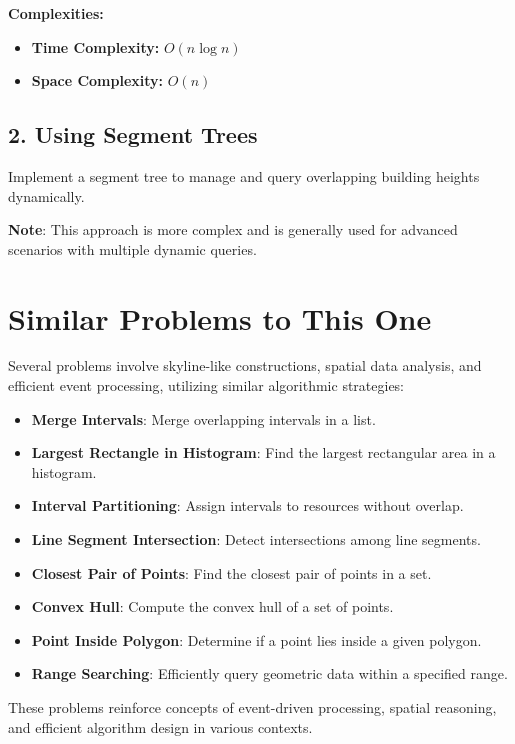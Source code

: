 \textbf{Complexities:}
\begin{itemize}
    \item \textbf{Time Complexity:} \(O(n \log n)\)
    \item \textbf{Space Complexity:} \(O(n)\)
\end{itemize}

\subsection*{2. Using Segment Trees}

Implement a segment tree to manage and query overlapping building heights dynamically.

\textbf{Note}: This approach is more complex and is generally used for advanced scenarios with multiple dynamic queries.

\section*{Similar Problems to This One}

Several problems involve skyline-like constructions, spatial data analysis, and efficient event processing, utilizing similar algorithmic strategies:

\begin{itemize}
    \item \textbf{Merge Intervals}: Merge overlapping intervals in a list.
    \item \textbf{Largest Rectangle in Histogram}: Find the largest rectangular area in a histogram.
    \item \textbf{Interval Partitioning}: Assign intervals to resources without overlap.
    \item \textbf{Line Segment Intersection}: Detect intersections among line segments.
    \item \textbf{Closest Pair of Points}: Find the closest pair of points in a set.
    \item \textbf{Convex Hull}: Compute the convex hull of a set of points.
    \item \textbf{Point Inside Polygon}: Determine if a point lies inside a given polygon.
    \item \textbf{Range Searching}: Efficiently query geometric data within a specified range.
\end{itemize}

These problems reinforce concepts of event-driven processing, spatial reasoning, and efficient algorithm design in various contexts.

